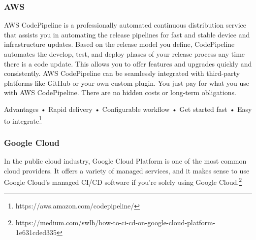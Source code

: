 %
\subsubsection{AWS}
%

AWS CodePipeline is a professionally automated continuous distribution service that assists you in automating the release pipelines for fast and stable device and infrastructure updates. Based on the release model you define, CodePipeline automates the develop, test, and deploy phases of your release process any time there is a code update. This allows you to offer features and upgrades quickly and consistently. AWS CodePipeline can be seamlessly integrated with third-party platforms like GitHub or your own custom plugin. You just pay for what you use with AWS CodePipeline. There are no hidden costs or long-term obligations.


Advantages
•	Rapid delivery
•	Configurable workflow
•	Get started fast
•	Easy to integrate\footnote{https://aws.amazon.com/codepipeline/}


%
\subsubsection{Google Cloud}
%
In the public cloud industry, Google Cloud Platform is one of the most common cloud providers. It offers a variety of managed services, and it makes sense to use Google Cloud's managed CI/CD software if you're solely using Google Cloud.\footnote{https://medium.com/swlh/how-to-ci-cd-on-google-cloud-platform-1e631cded335}


%
